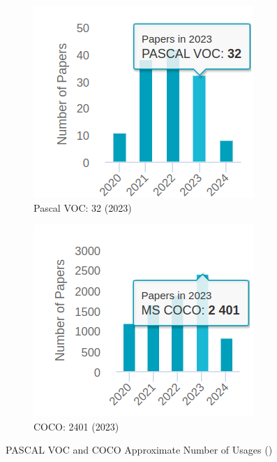 \begin{figure}[H]
    \centering
    \begin{subfigure}{0.40\textwidth}
        \centering
        \includegraphics[width=\textwidth]{Images/Dataset Usages/PASCAL.png}
        \caption{\centering Pascal VOC: 32 (2023)}
    \end{subfigure}
    \begin{subfigure}{0.40\textwidth}
        \centering
        \includegraphics[width=\textwidth]{Images/Dataset Usages/COCO.png}
        \caption{\centering COCO: 2401 (2023)}
    \end{subfigure}
    \caption{\centering PASCAL VOC and COCO Approximate Number of Usages (\cite{papers2024COCOusage})}
    \label{fig:coco_voc_usage}
\end{figure}

